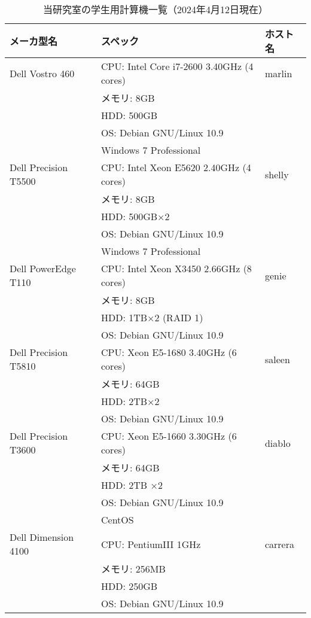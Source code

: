 \documentclass[main]{subfiles}
\begin{document}
\begin{table}[p]
    \caption{当研究室の学生用計算機一覧（2024年4月12日現在）}
    \begin{center}
    \begin{tabular}{|l|l|l|}
    \hline
    メーカ型名 & スペック & ホスト名 \\
    \hline
    Dell Vostro 460 & CPU: Intel Core i7-2600 3.40GHz (4 cores) & marlin \\
     & メモリ: 8GB & \\
     & HDD: 500GB & \\
     & OS: Debian GNU/Linux 10.9 & \\
     &     Windows 7 Professional & \\
    \hline
    Dell Precision T5500 & CPU: Intel Xeon E5620 2.40GHz (4 cores) & shelly \\
     & メモリ: 8GB & \\
     & HDD: 500GB×2 & \\
     & OS: Debian GNU/Linux 10.9 & \\
     &     Windows 7 Professional & \\
    \hline
    Dell PowerEdge T110 & CPU: Intel Xeon X3450 2.66GHz (8 cores) & genie \\
     & メモリ: 8GB & \\
     & HDD: 1TB×2 (RAID 1) & \\
     & OS: Debian GNU/Linux 10.9 & \\
    \hline
    Dell Precision T5810 & CPU: Xeon E5-1680 3.40GHz (6 cores) & saleen \\
     & メモリ: 64GB & \\
     & HDD: 2TB×2 & \\
     & OS: Debian GNU/Linux 10.9 & \\
    \hline
    Dell Precision T3600 & CPU: Xeon E5-1660 3.30GHz (6 cores) & diablo \\
     & メモリ: 64GB & \\
     & HDD: 2TB ×2 & \\
     & OS: Debian GNU/Linux 10.9 & \\
     &     CentOS & \\
    \hline
    Dell Dimension 4100 & CPU: PentiumIII 1GHz & carrera \\
     & メモリ: 256MB & \\
     & HDD: 250GB & \\
     & OS: Debian GNU/Linux 10.9 & \\
    \hline
    \end{tabular}
    \end{center}
\end{table}
\end{document}
